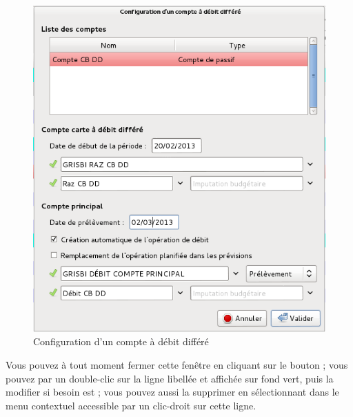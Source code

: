 \ifIllustration
\begin{figure}[h!]
\begin{center}
\includegraphics[scale=0.5]{image/screenshot/bankcard_defferedAccount}
\end{center}
\caption{Configuration d'un compte à débit différé}
\label{bankcard_defferedAccount-img}
\end{figure}
\fi

Vous pouvez à tout moment fermer cette fenêtre en cliquant sur le bouton  ; vous pouvez  par un double-clic sur la ligne libellée  et affichée sur fond vert{\couleur}, puis la modifier si besoin est ; vous pouvez aussi la supprimer en sélectionnant  dans le menu contextuel accessible par un clic-droit sur cette ligne.  

